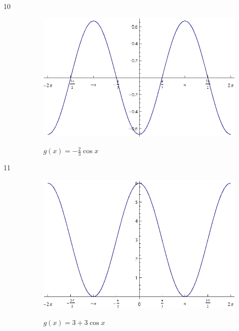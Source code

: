 \documentclass{exam}
\begin{document}
\begin{description}
      \item[10]
        \begin{figure}[H]
          \centering
          \includegraphics[scale=0.9]{exercise10.eps}

          $g(x) = - \frac{2}{3} \cos x$
        \end{figure}

      \item[11]
        \begin{figure}[H]
          \centering
          \includegraphics[scale=0.9]{exercise11.eps}

          $g(x) = 3 + 3 \cos x$
        \end{figure}


\end{description}
\end{document}
